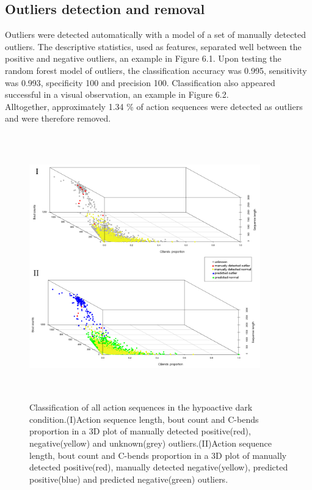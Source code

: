 \documentclass[a4paper,12pt]{article}
\begin{document}
\subsection{Outliers detection and removal}
Outliers were detected automatically with a model of a set of manually detected outliers.
The descriptive statistics, used as features, separated well between the positive and negative outliers, an example in Figure 6.1.
Upon testing the random forest model of outliers, the classification accuracy was 0.995, sensitivity was 0.993, specificity 100 and precision 100. Classification also appeared successful in a visual observation, an example in Figure 6.2.\\Alltogether, approximately 1.34 \% of action sequences were detected as outliers and were therefore removed.
\begin{figure}[h!]
\begin{center}
\includegraphics[width=10cm,height=11.5cm]{outliersEx.png}
\caption{Classification of all action sequences in the hypoactive dark condition.(I)Action sequence length, bout count and C-bends proportion in a 3D plot of manually detected positive(red), negative(yellow) and unknown(grey) outliers.(II)Action sequence length, bout count and C-bends proportion in a 3D plot of manually detected positive(red), manually detected negative(yellow), predicted positive(blue) and predicted negative(green) outliers.}
\end{center}
\end{figure}
\newpage
\end{document}
